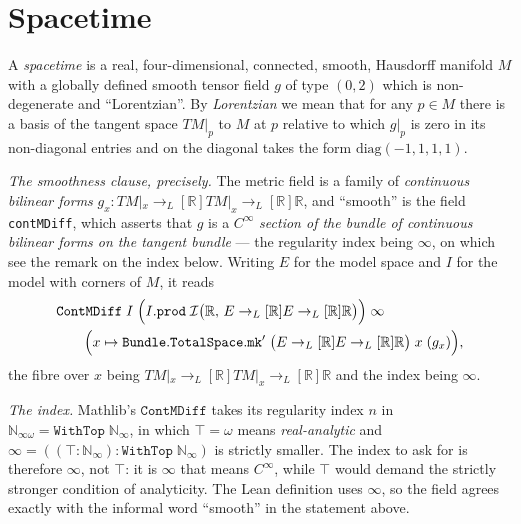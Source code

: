 \section{Spacetime}\label{sctn:spacetime}
\begin{definition}[Spacetime]
    \label{def:spacetime}
    \leanok
    A \textit{spacetime} is a real, four-dimensional, connected, smooth, Hausdorff manifold $M$ with a globally defined smooth tensor field $g$ of type $(0,2)$ which is non-degenerate and ``Lorentzian''. By \textit{Lorentzian} we mean that for any $p \in M$ there is a basis of the tangent space $TM|_p$ to $M$ at $p$ relative to which $g|_p$ is zero in its non-diagonal entries and on the diagonal takes the form $\text{diag}(-1,1,1,1)$.

    \emph{The smoothness clause, precisely.} The metric field is a family of \emph{continuous bilinear forms} $g_x : TM|_x \to_L[\mathbb{R}] TM|_x \to_L[\mathbb{R}] \mathbb{R}$, and ``smooth'' is the field \texttt{contMDiff}, which asserts that $g$ is a $C^\infty$ \emph{section of the bundle of continuous bilinear forms on the tangent bundle} --- the regularity index being $\infty$, on which see the remark on the index below. Writing $E$ for the model space and $I$ for the model with corners of $M$, it reads
    \begin{align}
        &\mathtt{ContMDiff}\;I\;\Big(I.\mathtt{prod}\;\mathcal{I}\big(\mathbb{R},\, E \to_L[\mathbb{R}] E \to_L[\mathbb{R}] \mathbb{R}\big)\Big)\;\infty \notag \\
        &\qquad \Big(x \mapsto \mathtt{Bundle.TotalSpace.mk'}\;\big(E \to_L[\mathbb{R}] E \to_L[\mathbb{R}] \mathbb{R}\big)\;x\;(g_x)\Big),
    \end{align}
    the fibre over $x$ being $TM|_x \to_L[\mathbb{R}] TM|_x \to_L[\mathbb{R}] \mathbb{R}$ and the index being $\infty$.

    \emph{The index.} Mathlib's $\mathtt{ContMDiff}$ takes its regularity index $n$ in $\mathbb{N}_{\infty\omega} = \mathtt{WithTop}\;\mathbb{N}_\infty$, in which $\top = \omega$ means \emph{real-analytic} and $\infty = ((\top : \mathbb{N}_\infty) : \mathtt{WithTop}\;\mathbb{N}_\infty)$ is strictly smaller. The index to ask for is therefore $\infty$, not $\top$: it is $\infty$ that means $C^\infty$, while $\top$ would demand the strictly stronger condition of analyticity. The Lean definition uses $\infty$, so the field agrees exactly with the informal word ``smooth'' in the statement above.


\end{definition}
